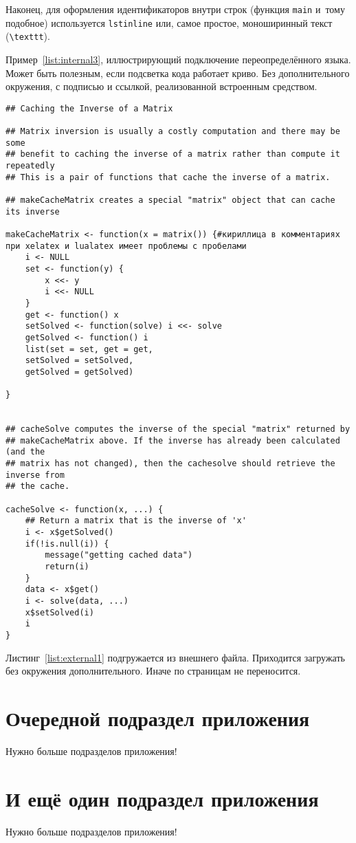 Наконец, для оформления идентификаторов внутри строк
(функция \lstinline{main} и~тому подобное) используется
\texttt{lstinline} или, самое простое, моноширинный текст
(\texttt{\textbackslash texttt}).

Пример~\ref{list:internal3}, иллюстрирующий подключение переопределённого
языка. Может быть полезным, если подсветка кода работает криво. Без
дополнительного окружения, с подписью и ссылкой, реализованной встроенным
средством.
\begingroup
\captiondelim{ } %
\begin{lstlisting}[language={Renhanced},caption={Пример листинга c подписью собственными средствами},label={list:internal3}]
## Caching the Inverse of a Matrix

## Matrix inversion is usually a costly computation and there may be some
## benefit to caching the inverse of a matrix rather than compute it repeatedly
## This is a pair of functions that cache the inverse of a matrix.

## makeCacheMatrix creates a special "matrix" object that can cache its inverse

makeCacheMatrix <- function(x = matrix()) {#кириллица в комментариях при xelatex и lualatex имеет проблемы с пробелами
    i <- NULL
    set <- function(y) {
        x <<- y
        i <<- NULL
    }
    get <- function() x
    setSolved <- function(solve) i <<- solve
    getSolved <- function() i
    list(set = set, get = get,
    setSolved = setSolved,
    getSolved = getSolved)
    
}


## cacheSolve computes the inverse of the special "matrix" returned by
## makeCacheMatrix above. If the inverse has already been calculated (and the
## matrix has not changed), then the cachesolve should retrieve the inverse from
## the cache.

cacheSolve <- function(x, ...) {
    ## Return a matrix that is the inverse of 'x'
    i <- x$getSolved()
    if(!is.null(i)) {
        message("getting cached data")
        return(i)
    }
    data <- x$get()
    i <- solve(data, ...)
    x$setSolved(i)
    i  
}
\end{lstlisting} %
\endgroup

Листинг~\ref{list:external1} подгружается из внешнего файла. Приходится
загружать без окружения дополнительного. Иначе по страницам не переносится.
\begingroup
\captiondelim{ } %
    
\endgroup


\section{Очередной подраздел приложения} \label{AppendixB4}

Нужно больше подразделов приложения!

\section{И ещё один подраздел приложения} \label{AppendixB5}

Нужно больше подразделов приложения!

